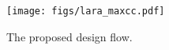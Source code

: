 \begin{comment}
  \begin{figure}[!h]
    \caption{The proposed design flow.}
    \begin{center}
      \begin{tikzpicture}[node distance = 2cm, auto, scale=0.5]
        \node [block] (csrc) {C source};
        \node [block, below of=csrc, left of=csrc] (maxrt) {CPU Runtime code};
        \node [block, below of=csrc, right of=csrc] (maxc) {MaxC Design};
        \node [block, below of=maxc] (maxj) {MaxJ Design};
        \node [block, below of=maxj] (maxfile) {Maxfile};
        \node [block, below of=maxfile, left of=maxfile] (app) {Application executable};
        \node [block, below of=app] (maxnode) {MaxNode, MaxStation};

        \node [cloud, right of=csrc] (lara) {LARA};
        \node [cloud, left of=csrc] (maxcc) {MaxCC};

        \path [line] (csrc) -- (maxrt);
        \path [line] (csrc) -- (maxc);
        \path [line] (maxc) -- (maxj);
        \path [line] (maxj) -- (maxfile);
        \path [line] (maxfile) -- (app);
        \path [line] (maxrt) -- (app);
        \path [line] (app) -- (maxnode);
        \path [line, dashed] (lara) -- (csrc);
        \path [line, dashed] (lara) -- (maxc);

      \end{tikzpicture}
    \end{center}
  \end{figure}
\end{comment}

\begin{figure}[!h]
  \texttt{[image: figs/lara\_maxcc.pdf]}
  \caption{The proposed design flow.}
  \label{fig:design-flow}
\end{figure}

